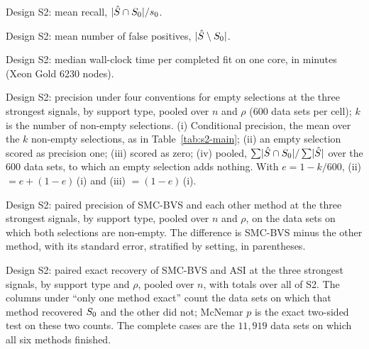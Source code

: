 \begin{table}[p]\centering\scriptsize\setlength{\tabcolsep}{3.2pt}\captionsetup{skip=4pt}
\caption{Design S2: mean recall, $\abs{\Shat\cap\Sz}/\sz$.}\label{tab:supp-s2-rec}

\end{table}

\begin{table}[p]\centering\scriptsize\setlength{\tabcolsep}{3.2pt}\captionsetup{skip=4pt}
\caption{Design S2: mean number of false positives, $\abs{\Shat\setminus\Sz}$.}\label{tab:supp-s2-fp}

\end{table}

\begin{table}[p]\centering\scriptsize\setlength{\tabcolsep}{3.2pt}\captionsetup{skip=4pt}
\caption{Design S2: median wall-clock time per completed fit on one core, in minutes (Xeon Gold 6230 nodes).}\label{tab:supp-s2-wall}

\end{table}

\begin{table}[htbp]\centering\scriptsize\setlength{\tabcolsep}{3.5pt}
\caption{Design S2: precision under four conventions for empty selections at the three strongest signals, by support
type, pooled over $n$ and $\rho$ ($600$ data sets per cell); $k$ is the number of non-empty selections. (i)
Conditional precision, the mean over the $k$ non-empty selections, as in Table~\ref{tab:s2-main}; (ii) an empty
selection scored as precision one; (iii) scored as zero; (iv) pooled, $\sum\abs{\Shat\cap\Sz}/\sum\abs{\Shat}$ over
the $600$ data sets, to which an empty selection adds nothing. With $e=1-k/600$, (ii) $=e+(1-e)\,$(i) and (iii)
$=(1-e)\,$(i).}\label{tab:supp-s2-prec-conv}

\end{table}

\begin{table}[htbp]\centering\scriptsize\setlength{\tabcolsep}{3.5pt}
\caption{Design S2: paired precision of SMC-BVS and each other method at the three strongest signals, by support
type, pooled over $n$ and $\rho$, on the data sets on which both selections are non-empty. The difference is SMC-BVS
minus the other method, with its standard error, stratified by setting, in parentheses.}\label{tab:supp-s2-prec-paired}

\end{table}

\begin{table}[htbp]\centering\small
\caption{Design S2: paired exact recovery of SMC-BVS and ASI at the three strongest signals, by support type and
$\rho$, pooled over $n$, with totals over all of S2. The columns under ``only one method
exact'' count the data sets on which that method recovered $\Sz$ and the other did not; McNemar $p$ is the exact
two-sided test on these two counts. The complete cases are the $11{,}919$ data sets on which all six methods
finished.}\label{tab:supp-s2-paired}

\end{table}


